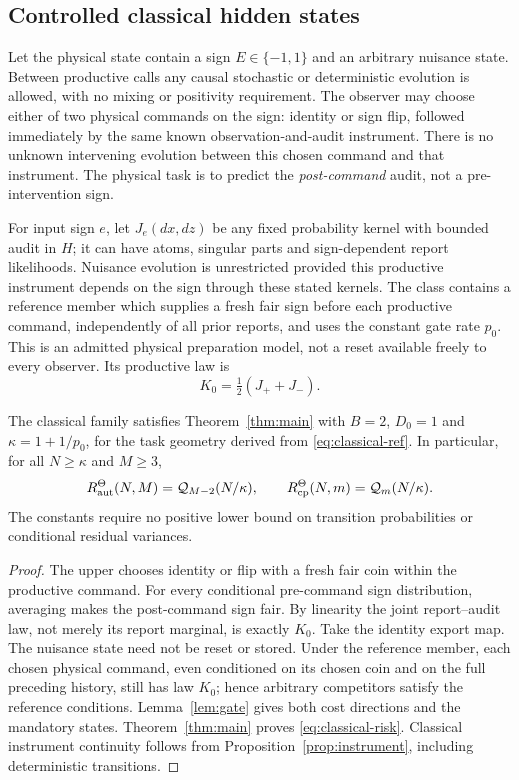 \subsection*{Controlled classical hidden states}
Let the physical state contain a sign $E\in\{-1,1\}$ and an arbitrary nuisance state. Between productive calls any causal stochastic or deterministic evolution is allowed, with no mixing or positivity requirement. The observer may choose either of two physical commands on the sign: identity or sign flip, followed immediately by the same known observation-and-audit instrument. There is no unknown intervening evolution between this chosen command and that instrument. The physical task is to predict the \emph{post-command} audit, not a pre-intervention sign.

For input sign $e$, let $J_e(dx,dz)$ be any fixed probability kernel with bounded audit in $H$; it can have atoms, singular parts and sign-dependent report likelihoods. Nuisance evolution is unrestricted provided this productive instrument depends on the sign through these stated kernels. The class contains a reference member which supplies a fresh fair sign before each productive command, independently of all prior reports, and uses the constant gate rate $p_0$. This is an admitted physical preparation model, not a reset available freely to every observer. Its productive law is
\begin{equation}\label{eq:classical-ref}
 K_0=\tfrac12(J_++J_-).
\end{equation}

\begin{theorem}\label{thm:classical}
The classical family satisfies Theorem~\ref{thm:main} with $B=2$, $D_0=1$ and $\kappa=1+1/p_0$, for the task geometry derived from \eqref{eq:classical-ref}. In particular, for all $N\ge\kappa$ and $M\ge3$,
\begin{equation}\label{eq:classical-risk}
 R_{\mathrm{aut}}^\Theta(N,M)=\mathcal Q_{M-2}(N/\kappa),\qquad
 R_{\mathrm{cp}}^\Theta(N,m)=\mathcal Q_m(N/\kappa).
\end{equation}
The constants require no positive lower bound on transition probabilities or conditional residual variances.
\end{theorem}
\begin{proof}
The upper chooses identity or flip with a fresh fair coin within the productive command. For every conditional pre-command sign distribution, averaging makes the post-command sign fair. By linearity the joint report--audit law, not merely its report marginal, is exactly $K_0$. Take the identity export map. The nuisance state need not be reset or stored. Under the reference member, each chosen physical command, even conditioned on its chosen coin and on the full preceding history, still has law $K_0$; hence arbitrary competitors satisfy the reference conditions. Lemma~\ref{lem:gate} gives both cost directions and the mandatory states. Theorem~\ref{thm:main} proves \eqref{eq:classical-risk}. Classical instrument continuity follows from Proposition~\ref{prop:instrument}, including deterministic transitions.
\end{proof}

